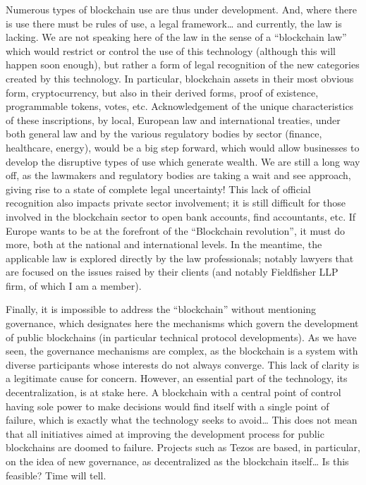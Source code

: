 \documentclass{tnreport}
\begin{document}
Numerous types of blockchain use are thus under development. And, where there is use there must be rules of use, a legal framework… and currently, the law is lacking. We are not speaking here of the law in the sense of a “blockchain law” which would restrict or control the use of this technology (although this will happen soon enough), but rather a form of legal recognition of the new categories created by this technology. In particular, blockchain assets in their most obvious form, cryptocurrency, but also in their derived forms, proof of existence, programmable tokens, votes, etc. Acknowledgement of the unique characteristics of these inscriptions, by local, European law and international treaties, under both general law and by the various regulatory bodies by sector (finance, healthcare, energy), would be a big step forward, which would allow businesses to develop the disruptive types of use which generate wealth.
We are still a long way off, as the lawmakers and regulatory bodies are taking a wait and see approach, giving rise to a state of complete legal uncertainty! This lack of official recognition also impacts private sector involvement; it is still difficult for those involved in the blockchain sector to open bank accounts, find accountants, etc. If Europe wants to be at the forefront of the “Blockchain revolution”, it must do more, both at the national and international levels.
In the meantime, the applicable law is explored directly by the law professionals; notably lawyers that are focused on the issues raised by their clients (and notably Fieldfisher LLP firm, of which I am a member).

Finally, it is impossible to address the “blockchain” without mentioning governance, which designates here the mechanisms which govern the development of public blockchains (in particular technical protocol developments). As we have seen, the governance mechanisms are complex, as the blockchain is a system with diverse participants whose interests do not always converge. This lack of clarity is a legitimate cause for concern. However, an essential part of the technology, its decentralization, is at stake here. A blockchain with a central point of control having sole power to make decisions would find itself with a single point of failure, which is exactly what the technology seeks to avoid… This does not mean that all initiatives aimed at improving the development process for public blockchains are doomed to failure. Projects such as Tezos are based, in particular, on the idea of new governance, as decentralized as the blockchain itself… Is this feasible? Time will tell.
\end{document}
